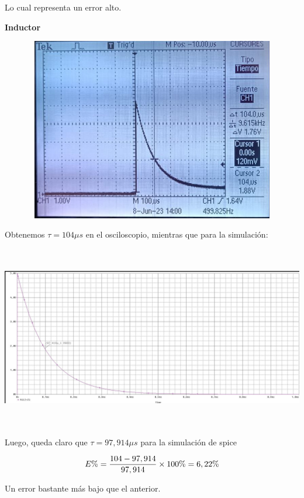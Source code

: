\documentclass[12pt]{article}
\begin{document}
\begin{enumerate}
	\noindent Lo cual representa un error alto.
	
	\noindent \textbf{Inductor}
	
	\begin{center}
		\includegraphics[width=16cm,height=8cm]{Img/inductor}
	\end{center}
	
	\noindent Obtenemos $\tau = 104 \mu s$ en el osciloscopio, mientras que para la simulación:
	
	\begin{center}
		\includegraphics[width=16cm,height=8cm]{Img/inductor_spice}
	\end{center}
	
	\noindent Luego, queda claro que $\tau = 97,914 \mu s$ para la simulación de spice
	
	\begin{equation}
		\notag E\% = \frac{104 - 97,914}{97,914}\times 100\% = 6,22\%
	\end{equation}
	
	\noindent Un error bastante más bajo que el anterior.
	
	\end{enumerate}
	
\end{document}
